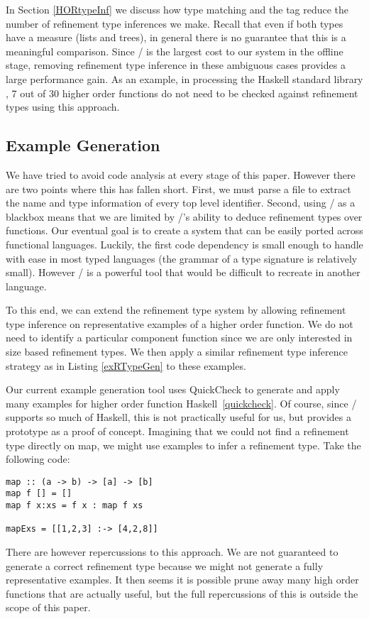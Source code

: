 In Section \ref{HORtypeInf} we discuss how type matching and the  tag reduce the number of refinement type inferences we make. Recall that even if both types have a measure (lists and trees), in general there is no guarantee that this is a meaningful comparison. Since \lhask/ is the largest cost to our system in the offline stage, removing refinement type inference in these ambiguous cases provides a large performance gain. As an example, in processing the Haskell standard library , 7 out of 30 higher order functions do not need to be checked against refinement types using this approach.


\subsection{Example Generation}\label{languageSupport}

We have tried to avoid code analysis at every stage of this paper.
However there are two points where this has fallen short. 
First, we must parse a file to extract the name and type information of every top level identifier. 
Second, using \lhask/ as a blackbox means that we are limited by \lhask/'s ability to deduce refinement types over functions. 
Our eventual goal is to create a system that can be easily ported across functional languages. 
Luckily, the first code dependency is small enough to handle with ease in most typed languages (the grammar of a type signature is relatively small). However \lhask/ is a powerful tool that would be difficult to recreate in another language. 

To this end, we can extend the refinement type system by allowing refinement type inference on representative examples of a higher order function.
We do not need to identify a particular component function since we are only interested in size based refinement types.
We then apply a similar refinement type inference strategy as in Listing \ref{exRTypeGen} to these examples.

Our current example generation tool uses QuickCheck to generate and apply many examples for higher order function Haskell~\ref{quickcheck}.
Of course, since \lhask/ supports so much of Haskell, this is not practically useful for us, but provides a prototype as a proof of concept.
Imagining that we could not find a refinement type directly on map, we might use examples to infer a refinement type. Take the following code:

\begin{lstlisting}[numbers=none]
map :: (a -> b) -> [a] -> [b]
map f [] = [] 
map f x:xs = f x : map f xs

mapExs = [[1,2,3] :-> [4,2,8]]
\end{lstlisting}

There are however repercussions to this approach. We are not guaranteed to generate a correct refinement type because we might not generate a fully representative examples. It then seems it is possible prune away many high order functions that are actually useful, but the full repercussions of this is outside the scope of this paper.



